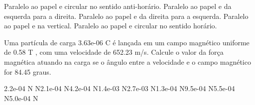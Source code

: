 \documentclass[12pt, addpoints]{exam}
\begin{document}
\begin{questions}
\begin{multicols*}{2}
        

\begin{choices}
\choice Paralelo ao papel e circular no sentido anti-horário. 
\choice Paralelo ao papel e da esquerda para a direita. 
\choice Paralelo ao papel e da direita para a esquerda. 
\choice Paralelo ao papel e na vertical. 
\choice Paralelo ao papel e circular no sentido horário. 
\end{choices}
\question Uma partícula de carga 3.63e-06 C é lançada em um campo magnético uniforme de    0.58 T , com uma velocidade de 652.23 m/s. Calcule o valor da força magnética atuando na carga se o ângulo entre a velocidade e o campo magnético for   84.45 graus.

\begin{oneparchoices}
\choice 2.2e-04 N N\choice 2.1e-04 N\choice 4.2e-04 N\choice 1.4e-03 N\choice 2.7e-03 N\choice 1.3e-04 N\choice 9.5e-04 N\choice 5.5e-04 N\choice 5.0e-04 N
\end{oneparchoices}\end{multicols*}
\end{questions}
\newpage
\end{document}
